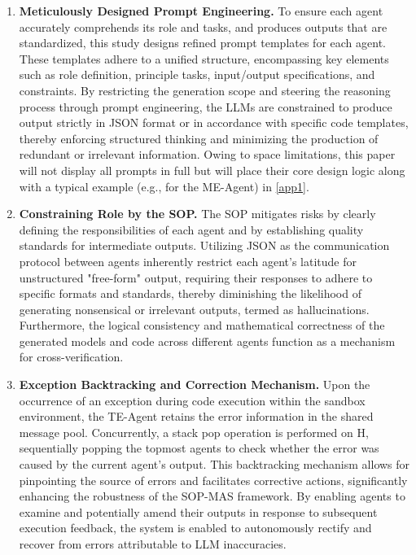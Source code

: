 \documentclass[preprint,12pt]{elsarticle}
\begin{document}
\begin{enumerate}[label=\arabic*)]
    \item \textbf{Meticulously Designed Prompt Engineering.} To ensure each agent accurately comprehends its role and tasks, and produces outputs that are standardized, this study designs refined prompt templates for each agent. These templates adhere to a unified structure, encompassing key elements such as role definition, principle tasks, input/output specifications, and constraints. By restricting the generation scope and steering the reasoning process through prompt engineering, the LLMs are constrained to produce output strictly in JSON format or in accordance with  specific code templates, thereby enforcing structured thinking and minimizing the production of redundant or irrelevant information. Owing to space limitations, this paper will not display all prompts in full but will place their core design logic along with a typical example (e.g., for the ME-Agent) in \ref{app1}.
    \item \textbf{Constraining Role by the SOP.} The SOP mitigates risks by clearly defining the responsibilities of each agent and by establishing quality standards for intermediate outputs. Utilizing JSON as the communication protocol between agents inherently restrict each agent's latitude for unstructured "free-form" output, requiring their responses to adhere to specific formats and standards, thereby diminishing the likelihood of generating nonsensical or irrelevant outputs, termed as hallucinations. Furthermore, the logical consistency and mathematical correctness of the generated models and code across different agents function as a mechanism for cross-verification.
    \item \textbf{Exception Backtracking and Correction Mechanism.} Upon the occurrence of an exception during code execution within the sandbox environment, the TE-Agent retains the error information in the shared message pool. Concurrently, a stack pop operation is performed on H, sequentially popping the topmost agents to check whether the error was caused by the current agent's output. This backtracking mechanism allows for pinpointing the source of errors and facilitates corrective actions, significantly enhancing the robustness of the SOP-MAS framework. By enabling agents to examine and potentially amend their outputs in response to subsequent execution feedback, the system is enabled to autonomously rectify and recover from errors attributable to LLM inaccuracies.
\end{enumerate}
\end{document}
